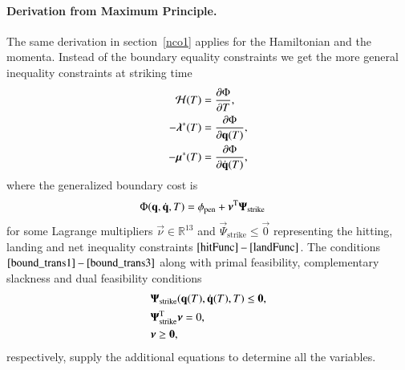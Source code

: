 \paragraph{\textbf{Derivation from Maximum Principle}.} The same derivation in section~\ref{nco1} applies for the Hamiltonian and the momenta. Instead of the boundary equality constraints we get the more general inequality constraints at striking time
%
\begin{align}
\mathcal{H}(T) &= \frac{\partial\Phi}{\partial T}, \label{bound_trans1}\\
-\boldsymbol{\mathrm{\lambda}}^{*}(T) &= \frac{\partial\Phi}{\partial\boldsymbol{\mathrm{q}}(T)}, \label{bound_trans2}\\
-\boldsymbol{\mathrm{\mu}}^{*}(T) &= \frac{\partial\Phi}{\partial\dot{\boldsymbol{\mathrm{q}}}(T)}, \label{bound_trans3}
\end{align}
%
\noindent where the generalized boundary cost is
%
\begin{align}
\Phi(\boldsymbol{\mathrm{q}},\dot{\boldsymbol{\mathrm{q}}},T) &= \phi_{\mathrm{pen}} + \boldsymbol{\mathrm{\nu}}^{\mathrm{T}}\boldsymbol{\mathrm{\Psi}}_{\mathrm{strike}}
\end{align}
%
for some Lagrange multipliers $\vec{\nu} \in \mathbb{R}^{13}$ and $\vec{\Psi}_{\mathrm{strike}} \leq \vec{0}$ representing the hitting, landing and net inequality constraints $\mbox{\eqref{hitFunc} -- \eqref{landFunc}}$. The conditions $\mbox{\eqref{bound_trans1} -- \eqref{bound_trans3}}$ along with primal feasibility, complementary slackness and dual feasibility conditions
%
\begin{align}
&\boldsymbol{\mathrm{\Psi}}_{\mathrm{strike}}(\boldsymbol{\mathrm{q}}(T),\dot{\boldsymbol{\mathrm{q}}}(T),T) \leq \boldsymbol{\mathrm{0}}, \\
&\boldsymbol{\mathrm{\Psi}}_{\mathrm{strike}}^{\mathrm{T}}\boldsymbol{\mathrm{\nu}} = 0, \\
&\boldsymbol{\mathrm{\nu}} \geq \boldsymbol{\mathrm{0}}, 
\end{align}
%
respectively, supply the additional equations to determine all the variables. 

